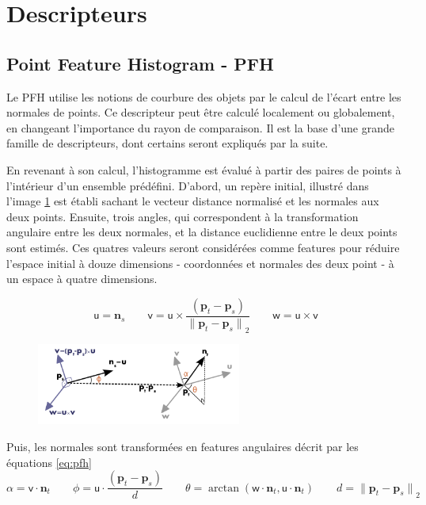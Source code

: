 \section {Descripteurs}
\label{annexe:descripteur}
\subsection{Point Feature Histogram - PFH}

Le PFH utilise les notions de courbure des objets par le calcul de
l'écart entre les normales de points. Ce descripteur peut être calculé
localement ou globalement, en changeant l'importance du rayon de
comparaison. Il est la base d'une grande famille de descripteurs, dont certains seront expliqués par la suite.

En revenant à son calcul, l'histogramme est évalué à partir des paires
de points à l'intérieur d’un ensemble prédéfini. D'abord, un repère
initial, illustré dans l'image \ref{fig:pfh} est établi sachant le vecteur distance normalisé et les normales aux deux points. Ensuite, trois angles, qui correspondent à la transformation angulaire entre les deux normales, et la distance euclidienne entre le deux points sont estimés. Ces quatres valeurs seront considérées comme features pour réduire l’espace initial à douze dimensions - coordonnées et normales des deux point - à un espace à quatre dimensions.


\begin{equation*}
  {\mathsf u} = \boldsymbol{n}_s \qquad
  {\mathsf v} =  {\mathsf u} \times \frac{(\boldsymbol{p}_t-\boldsymbol{p}_s)}{{\|\boldsymbol{p}_t-\boldsymbol{p}_s\|}_{2}}  \qquad
  {\mathsf w} = {\mathsf u} \times {\mathsf v}
\end{equation*}

\begin{figure}[H]
  \centering
  \includegraphics[width=0.6\textwidth]{pfh_frame.png}
	\label{fig:pfh}
\end{figure}


Puis, les normales sont transformées en features angulaires décrit par les équations \ref{eq:pfh}
\begin{equation}
  \alpha = {\mathsf v} \cdot \boldsymbol{n}_t  \qquad
  \phi   = {\mathsf u} \cdot \frac{(\boldsymbol{p}_t - \boldsymbol{p}_s)}{d} \qquad
  \theta = \arctan ({\mathsf w} \cdot \boldsymbol{n}_t, {\mathsf u} \cdot \boldsymbol{n}_t) \qquad
  d={\|\boldsymbol{p}_t-\boldsymbol{p}_s\|}_2 
	\label{eq:pfh}
\end{equation}

